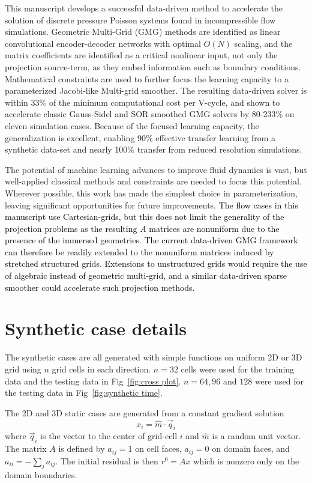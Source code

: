 \documentclass[]{elsarticle}
\begin{document}
This manuscript develops a successful data-driven method to accelerate the solution of discrete pressure Poisson systems found in incompressible flow simulations. Geometric Multi-Grid (GMG) methods are identified as linear convolutional encoder-decoder networks with optimal $O(N)$ scaling, and the matrix coefficients are identified as a critical nonlinear input, not only the projection source-term, as they embed information such as boundary conditions. Mathematical constraints are used to further focus the learning capacity to a parameterized Jacobi-like Multi-grid smoother. The resulting data-driven solver is within 33\% of the minimum computational cost per V-cycle, and shown to accelerate classic Gauss-Sidel and SOR smoothed GMG solvers by 80-233\% on eleven simulation cases. Because of the focused learning capacity, the generalization is excellent, enabling 90\% effective transfer learning from a synthetic data-set and nearly 100\% transfer from reduced resolution simulations.

The potential of machine learning advances to improve fluid dynamics is vast, but well-applied classical methods and constraints are needed to focus this potential. Wherever possible, this work has made the simplest choice in parameterization, leaving significant opportunities for future improvements. \textcolor{black}{The flow cases in this manuscript use Cartesian-grids, but this does not limit the generality of the projection problems as the resulting $A$ matrices are nonuniform due to the presence of the immersed geometries. The current data-driven GMG framework can therefore be readily extended to the nonuniform matrices induced by stretched structured grids. Extensions to unstructured grids would require the use of algebraic instead of geometric multi-grid, and a similar data-driven sparse smoother could accelerate such projection methods.}


\color{black}
\appendix
\section{Synthetic case details}\label{app synth}

The synthetic cases are all generated with simple functions on uniform 2D or 3D grid using $n$ grid cells in each direction. $n=32$ cells were used for the training data and the testing data in Fig~\ref{fig:cross plot}. $n=64,96$ and $128$ were used for the testing data in Fig~\ref{fig:synthetic time}.

The 2D and 3D static cases are generated from a constant gradient solution
$$ x_i = \hat m \cdot \vec q_i$$
where $\vec q_i$ is the vector to the center of grid-cell $i$ and $\hat m$ is a random unit vector. The matrix $A$ is defined by $a_{ij}=1$ on cell faces, $a_{ij}=0$ on domain faces, and $a_{ii}=-\sum_j a_{ij}$. The initial residual is then $r^0=A x$ which is nonzero only on the domain boundaries.
\end{document}
